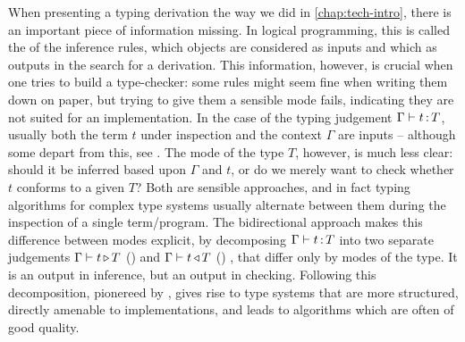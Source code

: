 
When presenting a typing derivation the way we did in \cref{chap:tech-intro}, there is
an important piece of information missing.
In logical programming, this is called the  of the inference rules,
\ie which objects are considered as inputs and which as outputs in the search
for a derivation.
This information, however, is crucial when one tries to build a type-checker:
some rules might seem fine when writing them down on paper, but trying to give them a
sensible mode fails, indicating they are not suited for an implementation.
In the case of the typing judgement $\Gamma \vdash t \operatorname{:} T$,
usually both the term $t$ under inspection and the context $\Gamma$ are inputs –
although some depart from this, see .
The mode of the type $T$, however, is much less clear: should it be inferred based upon
$\Gamma$ and $t$, or do we merely want to check whether $t$ conforms to a given $T$?
Both are sensible approaches, and in fact typing algorithms for complex type systems usually 
alternate between them during the inspection of a single term/program.
The bidirectional approach makes this difference between modes explicit,
by decomposing %
$\Gamma \vdash t \operatorname{:} T$ into two separate judgements $\Gamma \vdash t \operatorname{\triangleright} T$
() and $\Gamma \vdash t \operatorname{\triangleleft} T$ ()%
,
that differ only by modes of the type. It is an output in inference, but an output in checking.
Following this decomposition, pionereed by , gives rise to type
systems that are more structured, directly amenable to implementations,
and leads to algorithms which are often of good quality.%

